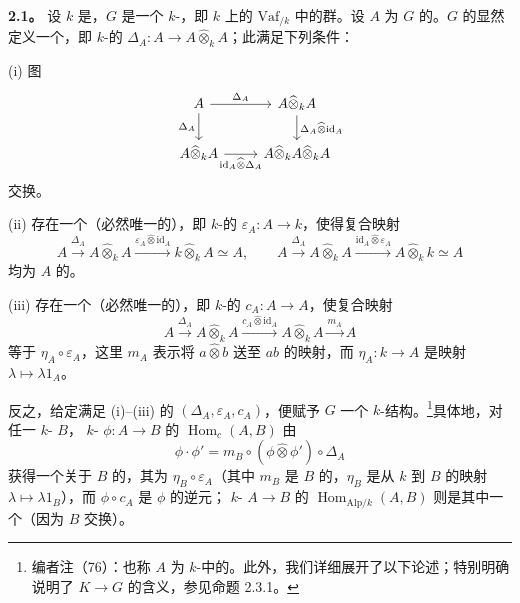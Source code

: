 \textbf{2.1。} 设 $k$ 是，$G$ 是一个 $k$-，即 $k$ 上的 $\mathrm{Vaf}_{/k}$ 中的群。设 $A$ 为 $G$ 的。$G$ 的显然定义一个，即 $k$-的 $\Delta_A:A\to A\widehat\otimes_k A$；此满足下列条件：

(i) 图
\[
\begin{tikzcd}
A\arrow[r,"\Delta_A"]\arrow[d,"\Delta_A"']&A\widehat\otimes_k A\arrow[d,"\Delta_A\widehat\otimes\mathrm{id}_A"]\\
A\widehat\otimes_k A\arrow[r,"\mathrm{id}_A\widehat\otimes\Delta_A"']&A\widehat\otimes_k A\widehat\otimes_k A
\end{tikzcd}
\]
交换。

(ii) 存在一个（必然唯一的），即 $k$-的 $\varepsilon_A:A\to k$，使得复合映射
\[
A\xrightarrow{\Delta_A}A\widehat\otimes_k A\xrightarrow{\varepsilon_A\widehat\otimes\mathrm{id}_A}k\widehat\otimes_k A\simeq A,
\qquad
A\xrightarrow{\Delta_A}A\widehat\otimes_k A\xrightarrow{\mathrm{id}_A\widehat\otimes\varepsilon_A}A\widehat\otimes_k k\simeq A
\]
均为 $A$ 的。

(iii) 存在一个（必然唯一的），即 $k$-的 $c_A:A\to A$，使复合映射
\[
A\xrightarrow{\Delta_A}A\widehat\otimes_k A\xrightarrow{c_A\widehat\otimes\mathrm{id}_A}A\widehat\otimes_k A\xrightarrow{m_A}A
\]
等于 $\eta_A\circ\varepsilon_A$，这里 $m_A$ 表示将 $a\widehat\otimes b$ 送至 $ab$ 的映射，而 $\eta_A:k\to A$ 是映射 $\lambda\mapsto\lambda1_A$。

反之，给定满足 (i)--(iii) 的 $(\Delta_A,\varepsilon_A,c_A)$，便赋予 $G$ 一个 $k$-结构。\footnote{编者注（76）：也称 $A$ 为 $k$-中的。此外，我们详细展开了以下论述；特别明确说明了 $K\to G$ 的含义，参见命题 2.3.1。}具体地，对任一 $k$- $B$， $k$- $\phi:A\to B$ 的 $\operatorname{Hom}_c(A,B)$ 由
\[
\phi\cdot\phi'=m_B\circ(\phi\widehat\otimes\phi')\circ\Delta_A
\]
获得一个关于 $B$ 的，其为 $\eta_B\circ\varepsilon_A$（其中 $m_B$ 是 $B$ 的，$\eta_B$ 是从 $k$ 到 $B$ 的映射 $\lambda\mapsto\lambda1_B$），而 $\phi\circ c_A$ 是 $\phi$ 的逆元； $k$- $A\to B$ 的 $\operatorname{Hom}_{\mathrm{Alp}/k}(A,B)$ 则是其中一个（因为 $B$ 交换）。

